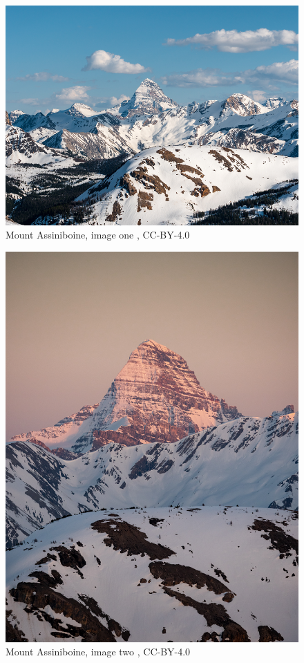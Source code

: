 \documentclass[
]{book}
\begin{document}
\begin{figure}
\includegraphics[width=0.75\linewidth]{images/12-assiniboine_day} \caption{Mount Assiniboine, image one \citep{maguire_mt_nodate}, CC-BY-4.0}\label{fig:12-assiniboine-day}
\end{figure}



\begin{figure}
\includegraphics[width=0.75\linewidth]{images/12-assiniboine_sunset} \caption{Mount Assiniboine, image two \citep{maguire_mt_nodate-1}, CC-BY-4.0}\label{fig:12-assiniboine-sunset}
\end{figure}
\end{document}
